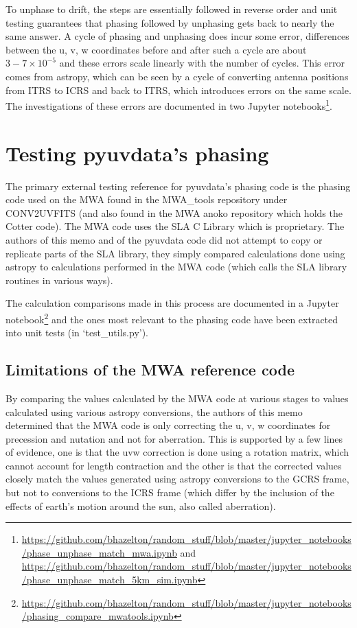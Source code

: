 \documentclass[11pt, oneside]{article}   	%
\begin{document}
To unphase to drift, the steps are essentially followed in reverse order and unit testing guarantees that phasing followed by unphasing gets back to nearly the same answer. A cycle of phasing and unphasing does incur some error, differences between the u, v, w coordinates before and after such a cycle are about ${3-7 \times 10^{-5}}$ and these errors scale linearly with the number of cycles. This error comes from astropy, which can be seen by a cycle of converting antenna positions from ITRS to ICRS and back to ITRS, which introduces errors on the same scale. The investigations of these errors are documented in two Jupyter notebooks\footnote{\url{https://github.com/bhazelton/random_stuff/blob/master/jupyter_notebooks/phase_unphase_match_mwa.ipynb} and \url{https://github.com/bhazelton/random_stuff/blob/master/jupyter_notebooks/phase_unphase_match_5km_sim.ipynb}}.

\section{Testing pyuvdata's phasing}

The primary external testing reference for pyuvdata's phasing code is the phasing code used on the MWA found in the MWA\_tools repository under CONV2UVFITS (and also found in the MWA anoko repository which holds the Cotter code). The MWA code uses the SLA C Library which is proprietary. The authors of this memo and of the pyuvdata code did not attempt to copy or replicate parts of the SLA library, they simply compared calculations done using astropy to calculations performed in the MWA code (which calls the SLA library routines in various ways).

The calculation comparisons made in this process are documented in a Jupyter notebook\footnote{\url{https://github.com/bhazelton/random_stuff/blob/master/jupyter_notebooks/phasing_compare_mwatools.ipynb}} and the ones most relevant to the phasing code have been extracted into unit tests (in `test\_utils.py').

\subsection{Limitations of the MWA reference code}
By comparing the values calculated by the MWA code at various stages to values calculated using various astropy conversions, the authors of this memo determined that the MWA code is only correcting the u, v, w coordinates for precession and nutation and not for aberration. This is supported by a few lines of evidence, one is that the uvw correction is done using a rotation matrix, which cannot account for length contraction and the other is that the corrected values closely match the values generated using astropy conversions to the GCRS frame, but not to conversions to the ICRS frame (which differ by the inclusion of the effects of earth's motion around the sun, also called aberration).
\end{document}
